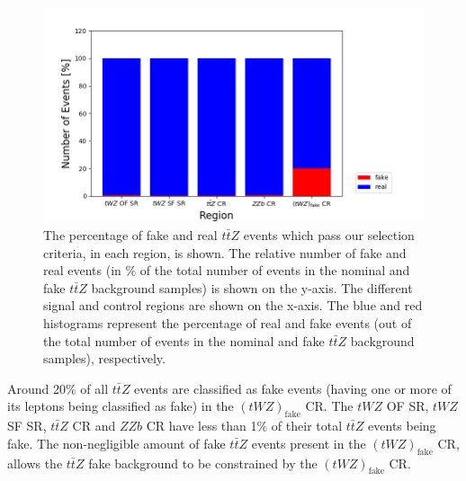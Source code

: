 \begin{figure}[htbp]
\centering

    \includegraphics[width=.8\textwidth]{figures/iff_bar_3.png}   

    \caption{The percentage of fake and real $t\bar{t}Z$ events which pass our selection criteria, in each region, is shown. The relative number of fake and real events (in $\%$ of the total number of events in the nominal and fake $t\bar{t}Z$ background samples) is shown on the y-axis. The different signal and control regions are shown on the x-axis. The blue and red histograms represent the percentage of real and fake events (out of the total number of events in the nominal and fake $t\bar{t}Z$ background samples), respectively. }
  \label{fig:4lep-iff-bar3}
\end{figure}

Around 20$\%$ of all $t\bar{t}Z$ events are classified as fake events (having one or more of its leptons being classified as fake) in the $(tWZ)_{\text{fake}}$ CR. The $tWZ$ OF SR, $tWZ$ SF SR, $t\bar{t}Z$ CR and $ZZb$ CR have less than 1$\%$ of their total $t\bar{t}Z$ events being fake. The non-negligible amount of fake $t\bar{t}Z$ events present in the $(tWZ)_{\text{fake}}$ CR, allows the $t\bar{t}Z$ fake background to be constrained by the $(tWZ)_{\text{fake}}$ CR.\\\\




